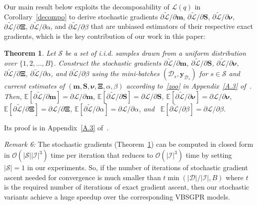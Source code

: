 \documentclass[conference]{IEEEtran}
\newtheorem{theorem}{Theorem}
\begin{document}
	Our main result below exploits the decomposability of $\mathcal{L}(q)$ in Corollary~\ref{decompo} to derive  stochastic gradients $\partial\widetilde{\mathcal{L}}/\partial\mathbf{m}$, $\partial\widetilde{\mathcal{L}}/\partial\mathbf{S}$, $\partial\widetilde{\mathcal{L}}/\partial\boldsymbol{\nu}$, $\partial\widetilde{\mathcal{L}}/\partial\mathbf{\Xi}$, $\partial\widetilde{\mathcal{L}}/\partial \alpha$, and $\partial\widetilde{\mathcal{L}}/\partial \beta$ that are unbiased estimators of their respective exact gradients,
	which is the key contribution of our work in this paper:\vspace{1mm}
	\begin{theorem}
		Let $\mathcal{S}$ be a set of i.i.d. samples drawn from a uniform distribution over $\{1,2,\dots,B\}$. %
		Construct the stochastic gradients $\partial\widetilde{\mathcal{L}}/\partial\mathbf{m}$, $\partial\widetilde{\mathcal{L}}/\partial\mathbf{S}$, $\partial\widetilde{\mathcal{L}}/\partial\boldsymbol{\nu}$, $\partial\widetilde{\mathcal{L}}/\partial\mathbf{\Xi}$, $\partial\widetilde{\mathcal{L}}/\partial \alpha$, and $\partial\widetilde{\mathcal{L}}/\partial\beta$ 
using the mini-batches $(\mathcal{D}_s, \mathbf{y}_{\mathcal{D}_s})$ for $s\in\mathcal{S}$ and current estimates of $(\mathbf{m}, \mathbf{S}, \boldsymbol{\nu}, \mathbf{\Xi}, \alpha, \beta)$ according to~\eqref{zoo} in Appendix~\ref{A.3} of~\cite{HaibinAPP}. 
		Then, $\mathbb{E}[\partial\widetilde{\mathcal{L}}/\partial\mathbf{m}]=\partial{\mathcal{L}}/\partial\mathbf{m}$, 
		$\mathbb{E}[\partial\widetilde{\mathcal{L}}/\partial\mathbf{S}]=\partial{\mathcal{L}}/\partial\mathbf{S}$, 
		$\mathbb{E}[\partial\widetilde{\mathcal{L}}/\partial\boldsymbol{\nu}]=\partial{\mathcal{L}}/\partial\boldsymbol{\nu}$,
		$\mathbb{E}[\partial\widetilde{\mathcal{L}}/\partial\mathbf{\Xi}]=\partial{\mathcal{L}}/\partial\mathbf{\Xi}$, $\mathbb{E}[\partial\widetilde{\mathcal{L}}/\partial \alpha]=\partial{\mathcal{L}}/\partial \alpha$, and \ $\mathbb{E}[\partial\widetilde{\mathcal{L}}/\partial \beta]=\partial{\mathcal{L}}/\partial \beta$.
		\label{thm2}\vspace{1mm}
	\end{theorem}	
Its proof is in Appendix~\ref{A.3} of~\cite{HaibinAPP}.\vspace{1mm} 

\emph{Remark 6:} The stochastic gradients (Theorem~\ref{thm2}) can be computed in closed form in $\mathcal{O}(|\mathcal{S}||\mathcal{I}|^3)$ time per iteration that reduces to $\mathcal{O}(|\mathcal{I}|^3)$ time by setting $|\mathcal{S}|=1$ in our experiments.
So, if the number of iterations of stochastic gradient ascent needed for convergence is  much smaller than $t \min(|\mathcal{D}|/|\mathcal{I}|,B)$ where $t$ is the required number of iterations of exact gradient ascent, then our stochastic variants achieve a huge speedup over the corresponding VBSGPR models.\vspace{0mm}
\end{document}
